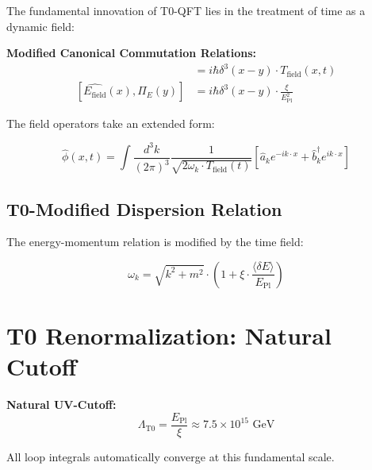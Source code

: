 \documentclass[12pt,a4paper]{article}
\newcommand{\Efield}{E_{\text{field}}}
\newcommand{\xipar}{\xi}
\newcommand{\deltaE}{\delta E}
\newcommand{\EPlanck}{E_{\text{Pl}}}
\begin{document}
	The fundamental innovation of T0-QFT lies in the treatment of time as a dynamic field:
	
	\begin{tcolorbox}[colback=green!5!white,colframe=green!75!black,title={T0 Canonical Quantization}]
		\textbf{Modified Canonical Commutation Relations:}
		\begin{align}
			[\hat{\phi}(x), \hat{\pi}(y)] &= i\hbar \delta^3(x-y) \cdot T_{\text{field}}(x,t) \\
			[\hat{\Efield}(x), \hat{\Pi}_E(y)] &= i\hbar \delta^3(x-y) \cdot \frac{\xipar}{\EPlanck^2}
		\end{align}
	\end{tcolorbox}
	
	The field operators take an extended form:
	
	\begin{equation}
		\hat{\phi}(x,t) = \int \frac{d^3k}{(2\pi)^3} \frac{1}{\sqrt{2\omega_k \cdot T_{\text{field}}(t)}} \left[\hat{a}_k e^{-ik \cdot x} + \hat{b}^\dagger_k e^{ik \cdot x}\right]
	\end{equation}
	
	\subsection{T0-Modified Dispersion Relation}
	
	The energy-momentum relation is modified by the time field:
	
	\begin{equation}
		\boxed{\omega_k = \sqrt{k^2 + m^2} \cdot \left(1 + \xipar \cdot \frac{\langle\deltaE\rangle}{\EPlanck}\right)}
	\end{equation}
	
	\section{T0 Renormalization: Natural Cutoff}
	
	\begin{tcolorbox}[colback=red!5!white,colframe=red!75!black,title={T0 Renormalization}]
		\textbf{Natural UV-Cutoff:}
		\begin{equation}
			\Lambda_{\text{T0}} = \frac{\EPlanck}{\xipar} \approx 7.5 \times 10^{15} \text{ GeV}
		\end{equation}
		
		All loop integrals automatically converge at this fundamental scale.
	\end{tcolorbox}
	
\end{document}
